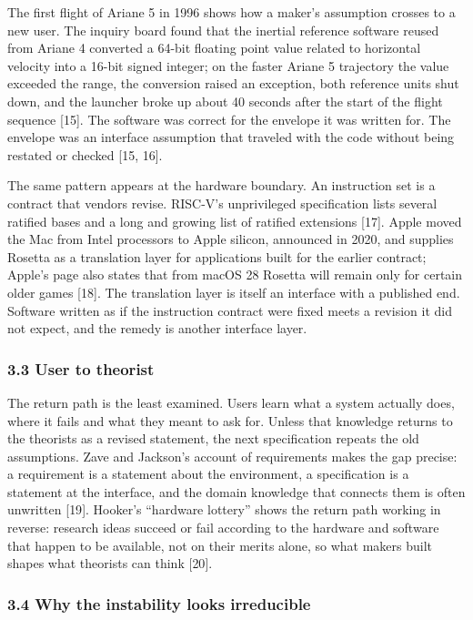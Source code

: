 \documentclass[
  10pt,
]{article}
\begin{document}
The first flight of Ariane 5 in 1996 shows how a maker's assumption
crosses to a new user. The inquiry board found that the inertial
reference software reused from Ariane 4 converted a 64-bit floating
point value related to horizontal velocity into a 16-bit signed integer;
on the faster Ariane 5 trajectory the value exceeded the range, the
conversion raised an exception, both reference units shut down, and the
launcher broke up about 40 seconds after the start of the flight
sequence {[}15{]}. The software was correct for the envelope it was
written for. The envelope was an interface assumption that traveled with
the code without being restated or checked {[}15, 16{]}.

The same pattern appears at the hardware boundary. An instruction set is
a contract that vendors revise. RISC-V's unprivileged specification
lists several ratified bases and a long and growing list of ratified
extensions {[}17{]}. Apple moved the Mac from Intel processors to Apple
silicon, announced in 2020, and supplies Rosetta as a translation layer
for applications built for the earlier contract; Apple's page also
states that from macOS 28 Rosetta will remain only for certain older
games {[}18{]}. The translation layer is itself an interface with a
published end. Software written as if the instruction contract were
fixed meets a revision it did not expect, and the remedy is another
interface layer.

\subsubsection{3.3 User to theorist}\label{user-to-theorist}

The return path is the least examined. Users learn what a system
actually does, where it fails and what they meant to ask for. Unless
that knowledge returns to the theorists as a revised statement, the next
specification repeats the old assumptions. Zave and Jackson's account of
requirements makes the gap precise: a requirement is a statement about
the environment, a specification is a statement at the interface, and
the domain knowledge that connects them is often unwritten {[}19{]}.
Hooker's ``hardware lottery'' shows the return path working in reverse:
research ideas succeed or fail according to the hardware and software
that happen to be available, not on their merits alone, so what makers
built shapes what theorists can think {[}20{]}.

\subsubsection{3.4 Why the instability looks
irreducible}\label{why-the-instability-looks-irreducible}
\end{document}
